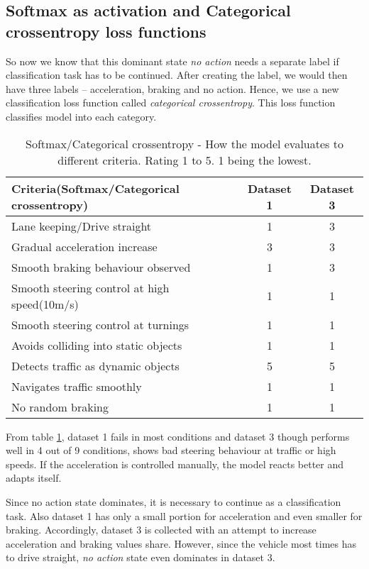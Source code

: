 \subsection{Softmax as activation and Categorical crossentropy loss functions}
So now we know that this dominant state \textit{no action} needs a separate label if
classification task has to be continued. After creating the label, we would then have
three labels -- acceleration, braking and no action. Hence, we use a new classification
loss function called \textit{categorical crossentropy}. This loss function classifies
model into each category.

\begin{table}[!ht]
    \centering
\begin{tabular}{lcc}
    \toprule
    Criteria(Softmax/Categorical crossentropy) & Dataset 1 & Dataset 3 \\\midrule
    Lane keeping/Drive straight  & 1 & 3  \\
    Gradual acceleration increase & 3 & 3\\
    Smooth braking behaviour observed & 1 & 3 \\
    Smooth steering control at high speed(10m/s) & 1 & 1 \\
    Smooth steering control at turnings & 1 & 1\\
    Avoids colliding into static objects & 1 & 1 \\
    Detects traffic as dynamic objects & 5 & 5\\
    Navigates traffic smoothly & 1 & 1\\
    No random braking & 1 & 1 \\\bottomrule
\end{tabular}
\caption{Softmax/Categorical crossentropy - How the model evaluates to different criteria.
Rating 1 to 5. 1 being the lowest.}
\label{table:softmaxandcce}
\end{table}

From table \ref{table:softmaxandcce}, dataset 1 fails in most conditions and dataset 3
though performs well in 4 out of 9 conditions, shows bad steering behaviour at traffic or high
speeds. If the acceleration is controlled manually, the model reacts better and adapts
itself.

Since no action state dominates, it is necessary to continue as a classification task.
Also dataset 1 has only a small portion for acceleration and even smaller for
braking. Accordingly, dataset 3 is collected with an attempt to increase acceleration
and braking values share. However, since the vehicle most times has to drive straight, \textit{no action} state even dominates in dataset 3.

